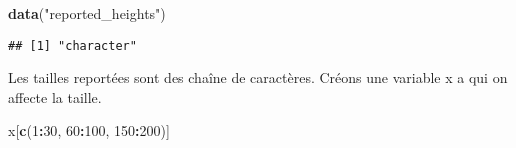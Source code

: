\documentclass[
]{article}
\newenvironment{Shaded}{\begin{snugshade}}{\end{snugshade}}
\newcommand{\DecValTok}[1]{\textcolor[rgb]{0.00,0.00,0.81}{#1}}
\newcommand{\FunctionTok}[1]{\textcolor[rgb]{0.13,0.29,0.53}{\textbf{#1}}}
\newcommand{\NormalTok}[1]{#1}
\newcommand{\OtherTok}[1]{\textcolor[rgb]{0.56,0.35,0.01}{#1}}
\newcommand{\SpecialCharTok}[1]{\textcolor[rgb]{0.81,0.36,0.00}{\textbf{#1}}}
\newcommand{\StringTok}[1]{\textcolor[rgb]{0.31,0.60,0.02}{#1}}
\begin{document}
\begin{Shaded}
\begin{Highlighting}[]
\FunctionTok{data}\NormalTok{(}\StringTok{"reported\_heights"}\NormalTok{)}
\end{Highlighting}
\end{Shaded}

\begin{Shaded}
\end{Shaded}

\begin{verbatim}
## [1] "character"
\end{verbatim}

Les tailles reportées sont des chaîne de caractères. Créons une variable
x a qui on affecte la taille.

\begin{Shaded}
\end{Shaded}

\begin{Shaded}
\begin{Highlighting}[]
\NormalTok{x[}\FunctionTok{c}\NormalTok{(}\DecValTok{1}\SpecialCharTok{:}\DecValTok{30}\NormalTok{, }\DecValTok{60}\SpecialCharTok{:}\DecValTok{100}\NormalTok{, }\DecValTok{150}\SpecialCharTok{:}\DecValTok{200}\NormalTok{)]}
\end{Highlighting}
\end{Shaded}
\end{document}
